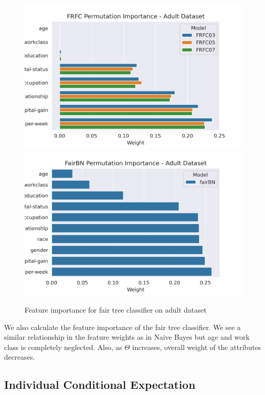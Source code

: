 \begin{figure}
    \centering
    \includegraphics{figures/frfc-permimportance-adult.png}
    \includegraphics[width=\linewidth]{figures/fairbn-permimportance-adult.png}
    \caption{Feature importance for fair tree classifier on adult dataset}
    \label{fig:my_label}
\end{figure}

We also calculate the feature importance of the fair tree classifier. We see a similar relationship in the feature weights as in Naive Bayes but age and work class is completely neglected. Also, as $\Theta$ increases, overall weight of the attributes decreases. 

\subsection{Individual Conditional Expectation}

